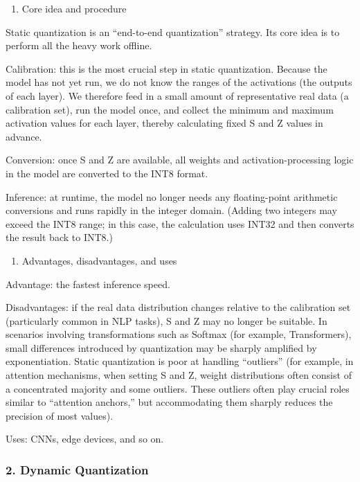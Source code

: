 \begin{enumerate}
\def\labelenumi{(\arabic{enumi})}
\tightlist
\item
  Core idea and procedure
\end{enumerate}

Static quantization is an ``end-to-end quantization'' strategy. Its core idea is to perform all the heavy work offline.

Calibration: this is the most crucial step in static quantization. Because the model has not yet run, we do not know the ranges of the activations (the outputs of each layer). We therefore feed in a small amount of representative real data (a calibration set), run the model once, and collect the minimum and maximum activation values for each layer, thereby calculating fixed S and Z values in advance.

Conversion: once S and Z are available, all weights and activation-processing logic in the model are converted to the INT8 format.

Inference: at runtime, the model no longer needs any floating-point arithmetic conversions and runs rapidly in the integer domain. (Adding two integers may exceed the INT8 range; in this case, the calculation uses INT32 and then converts the result back to INT8.)

\begin{enumerate}
\def\labelenumi{(\arabic{enumi})}
\setcounter{enumi}{1}
\tightlist
\item
  Advantages, disadvantages, and uses
\end{enumerate}

Advantage: the fastest inference speed.

Disadvantages: if the real data distribution changes relative to the calibration set (particularly common in NLP tasks), S and Z may no longer be suitable. In scenarios involving transformations such as Softmax (for example, Transformers), small differences introduced by quantization may be sharply amplified by exponentiation. Static quantization is poor at handling ``outliers'' (for example, in attention mechanisms, when setting S and Z, weight distributions often consist of a concentrated majority and some outliers. These outliers often play crucial roles similar to ``attention anchors,'' but accommodating them sharply reduces the precision of most values).

Uses: CNNs, edge devices, and so on.

\hypertarget{dynamic-quantization}{%
\subsubsection{2. Dynamic Quantization}\label{dynamic-quantization}}

